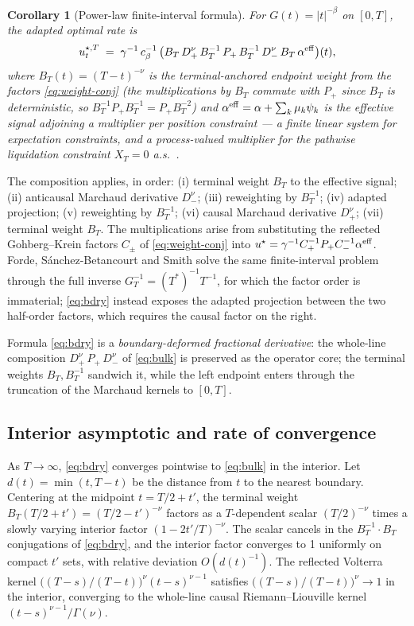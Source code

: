 \documentclass[11pt]{article}
\newcommand{\eff}{{\rm eff}}
\theoremstyle{plain}
\newtheorem{corollary}{Corollary}
\begin{document}
\begin{corollary}[Power-law finite-interval formula]
For $G(t) = |t|^{-\beta}$ on $[0,T]$, the adapted optimal rate is
\begin{equation}\label{eq:bdry}
u^{\star,T}_t \;=\; \gamma^{-1}\,c_\beta^{-1}\,\bigl(B_T\, D_+^\nu\, B_T^{-1}\, P_+\, B_T^{-1}\, D_-^\nu\, B_T\,\alpha^{\eff}\bigr)(t),
\end{equation}
where $B_T(t) = (T-t)^{-\nu}$ is the terminal-anchored endpoint weight from the factors \eqref{eq:weight-conj} (the multiplications by $B_T$ commute with $P_+$ since $B_T$ is deterministic, so $B_T^{-1}P_+B_T^{-1} = P_+B_T^{-2}$) and $\alpha^{\eff} = \alpha + \sum_k\mu_k\psi_k$ is the effective signal adjoining a multiplier per position constraint --- a finite linear system for expectation constraints, and a process-valued multiplier for the pathwise liquidation constraint $X_T=0$ a.s.\ \citep{FordeSanchezSmith2022}.
\end{corollary}

The composition applies, in order: (i) terminal weight $B_T$ to the effective signal; (ii) anticausal Marchaud derivative $D_-^\nu$; (iii) reweighting by $B_T^{-1}$; (iv) adapted projection; (v) reweighting by $B_T^{-1}$; (vi) causal Marchaud derivative $D_+^\nu$; (vii) terminal weight $B_T$. The multiplications arise from substituting the reflected Gohberg--Krein factors $C_\pm$ of \eqref{eq:weight-conj} into $u^\star = \gamma^{-1}C_+^{-1}P_+C_-^{-1}\alpha^{\eff}$. Forde, S\'anchez-Betancourt and Smith \citep[Thm~2.2]{FordeSanchezSmith2022} solve the same finite-interval problem through the full inverse $G_T^{-1}=(T^*)^{-1}T^{-1}$, for which the factor order is immaterial; \eqref{eq:bdry} instead exposes the adapted projection between the two half-order factors, which requires the causal factor on the right.

Formula \eqref{eq:bdry} is a \emph{boundary-deformed fractional derivative}: the whole-line composition $D_+^\nu\,P_+\,D_-^\nu$ of \eqref{eq:bulk} is preserved as the operator core; the terminal weights $B_T, B_T^{-1}$ sandwich it, while the left endpoint enters through the truncation of the Marchaud kernels to $[0,T]$.

\subsection{Interior asymptotic and rate of convergence}

As $T\to\infty$, \eqref{eq:bdry} converges pointwise to \eqref{eq:bulk} in the interior. Let $d(t) = \min(t,T-t)$ be the distance from $t$ to the nearest boundary. Centering at the midpoint $t = T/2 + t'$, the terminal weight $B_T(T/2+t') = (T/2-t')^{-\nu}$ factors as a $T$-dependent scalar $(T/2)^{-\nu}$ times a slowly varying interior factor $(1-2t'/T)^{-\nu}$. The scalar cancels in the $B_T^{-1}\cdot B_T$ conjugations of \eqref{eq:bdry}, and the interior factor converges to 1 uniformly on compact $t'$ sets, with relative deviation $O(d(t)^{-1})$. The reflected Volterra kernel $\bigl((T-s)/(T-t)\bigr)^{\nu}(t-s)^{\nu-1}$ satisfies $\bigl((T-s)/(T-t)\bigr)^{\nu}\to 1$ in the interior, converging to the whole-line causal Riemann--Liouville kernel $(t-s)^{\nu-1}/\Gamma(\nu)$.
\end{document}
